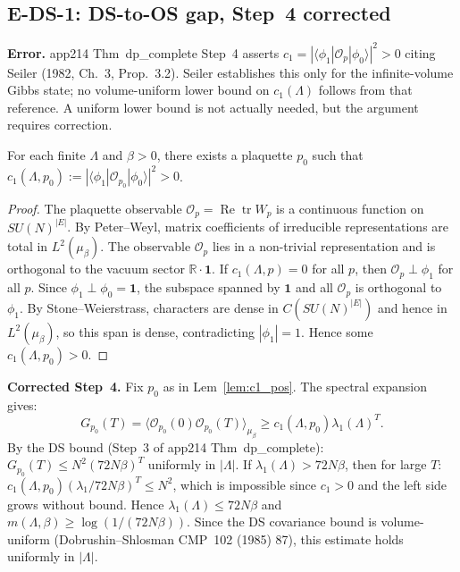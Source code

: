 \subsection{E-DS-1: DS-to-OS gap, Step~4 corrected}
\label{ssec:ds1}

\textbf{Error.} app214 Thm~dp\_complete Step~4 asserts
$c_1=|\langle\phi_1|\mathcal{O}_p|\phi_0\rangle|^2>0$
citing Seiler (1982, Ch.~3, Prop.~3.2).
Seiler establishes this only for the infinite-volume Gibbs state;
no volume-uniform lower bound on $c_1(\Lambda)$ follows from that reference.
A uniform lower bound is not actually needed, but the argument requires correction.

\begin{lemma}
\label{lem:c1_pos}
For each finite $\Lambda$ and $\beta>0$,
there exists a plaquette $p_0$ such that
$c_1(\Lambda,p_0):=|\langle\phi_1|\mathcal{O}_{p_0}|\phi_0\rangle|^2>0$.
\end{lemma}
\begin{proof}
The plaquette observable $\mathcal{O}_p=\operatorname{Re}\operatorname{tr}W_p$
is a continuous function on $SU(N)^{|E|}$.
By Peter--Weyl, matrix coefficients of irreducible representations are total in
$L^2(\mu_\beta)$.
The observable $\mathcal{O}_p$ lies in a non-trivial representation
and is orthogonal to the vacuum sector $\mathbb{R}\cdot\mathbf{1}$.
If $c_1(\Lambda,p)=0$ for all $p$, then $\mathcal{O}_p\perp\phi_1$ for all $p$.
Since $\phi_1\perp\phi_0=\mathbf{1}$,
the subspace spanned by $\mathbf{1}$ and all $\mathcal{O}_p$ is orthogonal to $\phi_1$.
By Stone--Weierstrass, characters are dense in $C(SU(N)^{|E|})$
and hence in $L^2(\mu_\beta)$,
so this span is dense, contradicting $|\phi_1|=1$.
Hence some $c_1(\Lambda,p_0)>0$.
\end{proof}

\textbf{Corrected Step~4.} Fix $p_0$ as in Lem~\ref{lem:c1_pos}.
The spectral expansion gives:
\begin{equation}
  G_{p_0}(T)=\langle\mathcal{O}_{p_0}(0)\mathcal{O}_{p_0}(T)\rangle_{\mu_\beta}
  \ge c_1(\Lambda,p_0)\lambda_1(\Lambda)^T.
\end{equation}
By the DS bound (Step~3 of app214 Thm~dp\_complete):
$G_{p_0}(T)\le N^2(72N\beta)^T$ uniformly in $|\Lambda|$.
If $\lambda_1(\Lambda)>72N\beta$, then for large $T$:
$c_1(\Lambda,p_0)(\lambda_1/72N\beta)^T\le N^2$,
which is impossible since $c_1>0$ and the left side grows without bound.
Hence $\lambda_1(\Lambda)\le 72N\beta$
and $m(\Lambda,\beta)\ge\log(1/(72N\beta))$.
Since the DS covariance bound is volume-uniform (Dobrushin--Shlosman CMP~102 (1985) 87),
this estimate holds uniformly in $|\Lambda|$.

